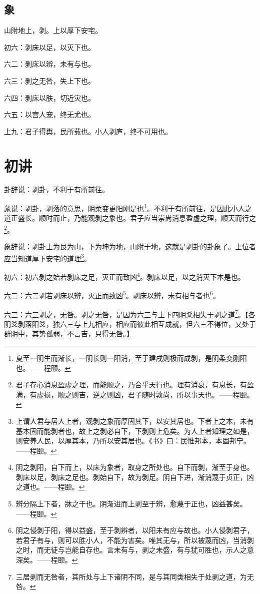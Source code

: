 \documentclass[12pt,oneside]{book}
\begin{document}
\subsection{象}
山附地上，剥。上以厚下安宅。

初六：剥床以足，以灭下也。

六二：剥床以辨，未有与也。

六三：剥之无咎，失上下也。

六四：剥床以肤，切近灾也。

六五：以宫人宠，终无尤也。

上九：君子得舆，民所载也。小人剥庐，终不可用也。

\section{初讲}
卦辞说：剥卦，不利于有所前往。

彖说：剥卦，剥落的意思，阴柔变更阳刚是也\footnote{夏至一阴生而渐长，一阴长则一阳消，至于建戌则极而成剥，是阴柔变刚阳也。——程颐。}。不利于有所前往，是因此小人之道正盛长。顺时而止，乃能观剥之象也。君子应当崇尚消息盈虚之理，顺天而行之\footnote{君子存心消息盈虚之理，而能顺之，乃合乎天行也。理有消衰，有息长，有盈满，有虚损，顺之则吉，逆之则凶，君子随时敦尚，所以事天也。——程颐。}。

象辞说：剥卦上为艮为山，下为坤为地，山附于地，这就是剥卦的卦象了。上位者应当知道厚下安宅的道理\footnote{上谓人君与居人上者，观剥之象而厚固其下，以安其居也。下者上之本，未有基本固而能剥者也，故上之剥必自下，下剥则上危矣。为人上者知理之如是，则安养人民，以厚其本，乃所以安其居也。《书》曰：民惟邦本，本固邦宁。——程颐。}。


初六：初六剥之始若剥床之足，灭正而致凶\footnote{阴之剥阳，自下而上，以床为象者，取身之所处也。自下而剥，渐至于身也。剥床以足，剥床之足也。剥始自下，故为剥足。阴自下进，渐消蔑于贞正，凶之道也。——程颐。}。剥床以足，以之消灭下本是也。

六二：六二剥若剥床以辨，灭正而致凶\footnote{辨分隔上下者，牀之干也。阴渐进而上剥至于辨，愈蔑于正也，凶益甚矣。——程颐。}。剥床以辨，未有相与者也\footnote{阴之侵剥于阳，得以益盛，至于剥辨者，以阳未有应与故也。小人侵剥君子，若君子有与，则可以胜小人，不能为害矣。唯其无与，所以被蔑而凶，当消剥之时，而无徒与岂能自存也。言未有与，剥之未盛，有与犹可胜也，示人之意深矣。——程颐。}。

六三：六三剥之，无咎。剥之无咎，是因为六三与上下四阴爻相失于剥之道\footnote{三居剥而无咎者，其所处与上下诸阴不同，是与其同类相失于处剥之道，为无咎。}。【各阴爻剥落阳爻，独六三与上九相应，相应而彼此相互成就，但六三不得位，又处于群阴中，其势孤弱，不言吉，只得无咎。】
\end{document}
